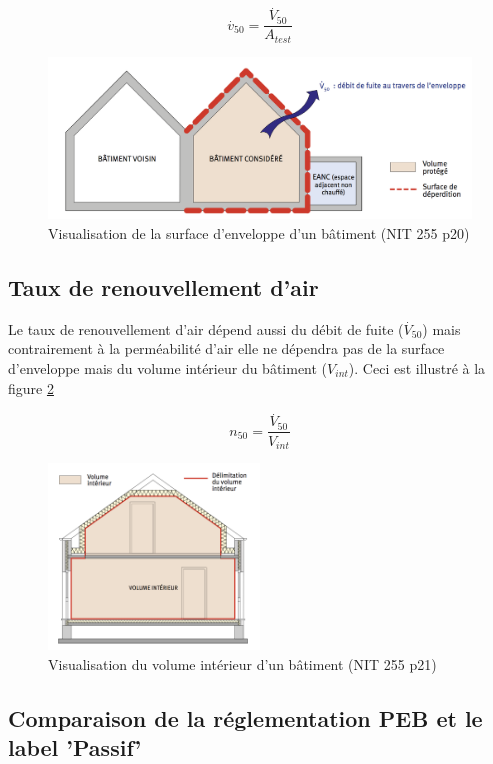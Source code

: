 $$\stackrel{.}{v}_{50}= \dfrac{\stackrel{.}{V}_{50}}{A_{test}}$$

\begin{figure}[ht]
\centering
\includegraphics[width=1.0\textwidth]{SurfaceEnveloppe}
\caption{\label{SurfaceEnveloppe} Visualisation de la surface d'enveloppe d'un bâtiment (NIT 255 p20)}
\end{figure}

\subsection{Taux de renouvellement d'air}
Le taux de renouvellement d'air dépend aussi du débit de fuite ($\stackrel{.}{V}_{50}$) mais contrairement à la perméabilité d'air elle ne dépendra pas de la surface d'enveloppe mais du volume intérieur du bâtiment ($V_{int}$). Ceci est illustré à la figure \ref{VolumeInterieur}

$$n_{50} =  \dfrac{\stackrel{.}{V}_{50}}{V_{int}}$$

\begin{figure}[ht]
\centering
\includegraphics[width=0.5\textwidth]{VolumeInterieur}
\caption{\label{VolumeInterieur} Visualisation du volume intérieur d'un bâtiment (NIT 255 p21)}
\end{figure}

\subsection{Comparaison de la réglementation PEB et le label 'Passif'}

